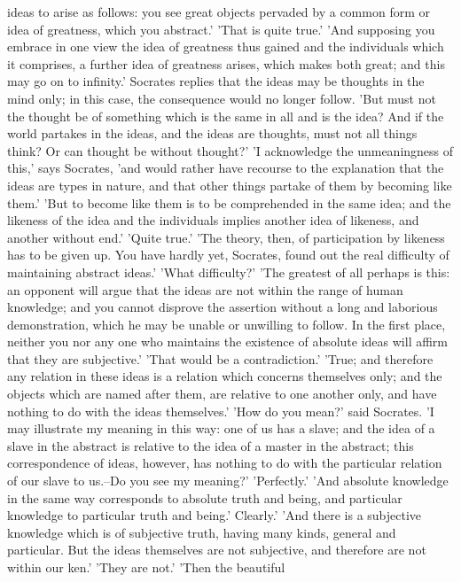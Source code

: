 ideas to arise as follows: you see great objects pervaded by a common
form or idea of greatness, which you abstract.' 'That is quite true.'
'And supposing you embrace in one view the idea of greatness thus gained
and the individuals which it comprises, a further idea of greatness
arises, which makes both great; and this may go on to infinity.'
Socrates replies that the ideas may be thoughts in the mind only; in
this case, the consequence would no longer follow. 'But must not the
thought be of something which is the same in all and is the idea? And
if the world partakes in the ideas, and the ideas are thoughts, must not
all things think? Or can thought be without thought?' 'I acknowledge the
unmeaningness of this,' says Socrates, 'and would rather have recourse
to the explanation that the ideas are types in nature, and that other
things partake of them by becoming like them.' 'But to become like them
is to be comprehended in the same idea; and the likeness of the idea and
the individuals implies another idea of likeness, and another without
end.' 'Quite true.' 'The theory, then, of participation by likeness
has to be given up. You have hardly yet, Socrates, found out the real
difficulty of maintaining abstract ideas.' 'What difficulty?' 'The
greatest of all perhaps is this: an opponent will argue that the ideas
are not within the range of human knowledge; and you cannot disprove the
assertion without a long and laborious demonstration, which he may be
unable or unwilling to follow. In the first place, neither you nor any
one who maintains the existence of absolute ideas will affirm that they
are subjective.' 'That would be a contradiction.' 'True; and therefore
any relation in these ideas is a relation which concerns themselves
only; and the objects which are named after them, are relative to one
another only, and have nothing to do with the ideas themselves.' 'How do
you mean?' said Socrates. 'I may illustrate my meaning in this way: one
of us has a slave; and the idea of a slave in the abstract is relative
to the idea of a master in the abstract; this correspondence of ideas,
however, has nothing to do with the particular relation of our slave to
us.--Do you see my meaning?' 'Perfectly.' 'And absolute knowledge in
the same way corresponds to absolute truth and being, and particular
knowledge to particular truth and being.' Clearly.' 'And there is a
subjective knowledge which is of subjective truth, having many kinds,
general and particular. But the ideas themselves are not subjective, and
therefore are not within our ken.' 'They are not.' 'Then the beautiful
